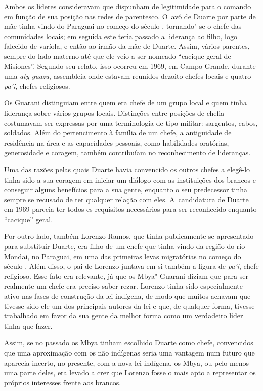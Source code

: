Ambos os líderes consideravam que dispunham de legitimidade para o
comando em função de sua posição nas redes de parentesco. O~avô de
Duarte por parte de mãe tinha vindo do Paraguai no começo do século ,
tornando"-se o chefe das comunidades locais; em seguida este teria
passado a liderança ao filho, logo falecido de varíola, e então ao
irmão da mãe de Duarte. Assim, vários parentes, sempre do lado materno
até que ele veio a ser nomeado ``cacique geral de Misiones''. Segundo seu
relato, isso ocorreu em 1969, em Campo Grande, durante uma \emph{aty guazu},
assembleia onde estavam reunidos dezoito chefes locais e quatro \emph{pa’i},
chefes religiosos. 

Os Guarani distinguiam entre quem era chefe de um grupo local e quem
tinha liderança sobre vários grupos locais. Distinções entre posições
de chefia costumavam ser expressas por uma terminologia de tipo
militar: sargentos, cabos, soldados. Além do pertencimento à família de
um chefe, a antiguidade de residência na área e as capacidades
pessoais, como habilidades oratórias, generosidade e coragem, também
contribuíam no reconhecimento de lideranças. 

Uma das razões pelas quais Duarte havia convencido os outros chefes a
elegê-lo tinha sido a sua coragem em iniciar um diálogo com as
instituições dos brancos e conseguir alguns benefícios para a sua
gente, enquanto o seu predecessor tinha sempre se recusado de ter
qualquer relação com eles. A~candidatura de Duarte em 1969 parecia ter
todos es requisitos necessários para ser reconhecido enquanto ``cacique''
geral.

Por outro lado, também Lorenzo Ramos, que tinha publicamente se
apresentado para substituir Duarte, era filho de um chefe que tinha
vindo da região do rio Mondai, no Paraguai, em uma das primeiras levas
migratórias no começo do século . Além disso, o pai de Lorenzo
juntava em si também a figura de \emph{pa’i}, chefe religioso. Esse fato era
relevante, já que os Mbya"-Guarani diziam que para ser realmente um
chefe era preciso saber rezar. Lorenzo tinha sido especialmente ativo
nas fases de construção da lei indígena, de modo que muitos achavam que
tivesse sido ele um dos principais autores da lei e que, de qualquer
forma, tivesse trabalhado em favor da sua gente da melhor forma como um
verdadeiro líder tinha que fazer.

Assim, se no passado os Mbya tinham escolhido Duarte como chefe,
convencidos que uma aproximação com os não indígenas seria uma vantagem
num futuro que aparecia incerto, no presente, com a nova lei indígena,
os Mbya, ou pelo menos uma parte deles, era levado a crer que Lorenzo
fosse o mais apto a representar os próprios interesses frente aos
brancos.

